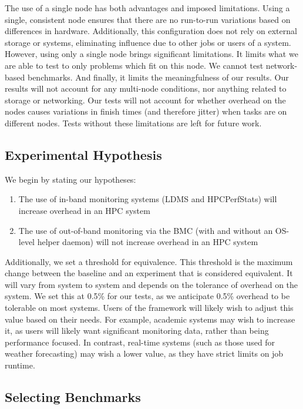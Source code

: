 \documentclass[conference]{IEEEtran}
\begin{document}
The use of a single node has both advantages and imposed limitations. Using a 
single, consistent node ensures that there are no run-to-run variations based
on differences in hardware. Additionally, this configuration does not rely on
external storage or systems, eliminating influence due to other jobs or users of
a system. However, using only a single node brings significant limitations.
It limits what we are able to test to only problems which fit on this node. We
cannot test network-based benchmarks. And finally, it limits the meaningfulness of 
our results. Our results will not account for any multi-node conditions, nor 
anything related to storage or networking. Our tests will not account for whether 
overhead on the nodes causes variations in finish times (and therefore jitter)
when tasks are on different nodes. Tests without these limitations are left for 
future work.

\subsection{Experimental Hypothesis}

We begin by stating our hypotheses:

\begin{enumerate}
    \item The use of in-band monitoring systems (LDMS and HPCPerfStats) will increase overhead in an HPC 
    system
    \item The use of out-of-band monitoring via the BMC (with and without an OS-level helper daemon) will not increase overhead in an HPC
    system
\end{enumerate}

Additionally, we set a threshold for equivalence. This threshold is the maximum 
change between the baseline and an experiment that is considered equivalent. It
will vary from system to system and depends on the tolerance of overhead on the system.
We set this at 0.5\% for our tests, as we anticipate 0.5\% overhead to be tolerable on
most systems. Users of the framework will likely wish to adjust this value based on their
needs. For example, academic systems may wish to increase it, as users will likely want 
significant monitoring data, rather than being performance focused. In contrast, real-time
systems (such as those used for weather forecasting) may wish a lower value, as they have 
strict limits on job runtime.


\subsection{Selecting Benchmarks}
\end{document}
